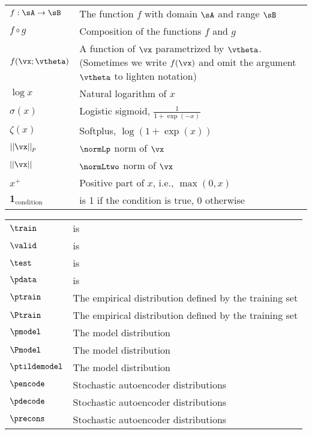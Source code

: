 \bgroup
\def\arraystretch{1.5}
\begin{tabular}{p{1.5in}p{3.5in}}
$\displaystyle f: \sA \rightarrow \sB$ & The function $f$ with domain $\sA$ and range $\sB$ \\
$\displaystyle f \circ g $ & Composition of the functions $f$ and $g$ \\
  $\displaystyle f(\vx ; \vtheta) $ & A function of $\vx$ parametrized by $\vtheta$.
  (Sometimes we write $f(\vx)$ and omit the argument $\vtheta$ to lighten notation) \\
$\displaystyle \log x$ & Natural logarithm of $x$ \\
$\displaystyle \sigma(x)$ & Logistic sigmoid, $\displaystyle \frac{1} {1 + \exp(-x)}$ \\
$\displaystyle \zeta(x)$ & Softplus, $\log(1 + \exp(x))$ \\
$\displaystyle || \vx ||_p $ & $\normLp$ norm of $\vx$ \\
$\displaystyle || \vx || $ & $\normLtwo$ norm of $\vx$ \\
$\displaystyle x^+$ & Positive part of $x$, i.e., $\max(0,x)$ \\
$\displaystyle \bm{1}_\mathrm{condition}$ & is 1 if the condition is true, 0 otherwise \\
\end{tabular}
\egroup
\vspace{0.5cm}

\bgroup
\def\arraystretch{1.5}
\begin{tabular}{p{1.5in}p{3.5in}}
$\train$ & is \\
$\valid$ & is \\
$\test$ & is \\
$\pdata$ & is \\
$\ptrain$ & The empirical distribution defined by the training set \\
$\Ptrain$ & The empirical distribution defined by the training set \\
$\pmodel$ & The model distribution \\
$\Pmodel$ & The model distribution \\
$\ptildemodel$ & The model distribution \\
$\pencode$ & Stochastic autoencoder distributions \\
$\pdecode$ & Stochastic autoencoder distributions \\
$\precons$ & Stochastic autoencoder distributions \\
\end{tabular}
\egroup
\vspace{0.5cm}
